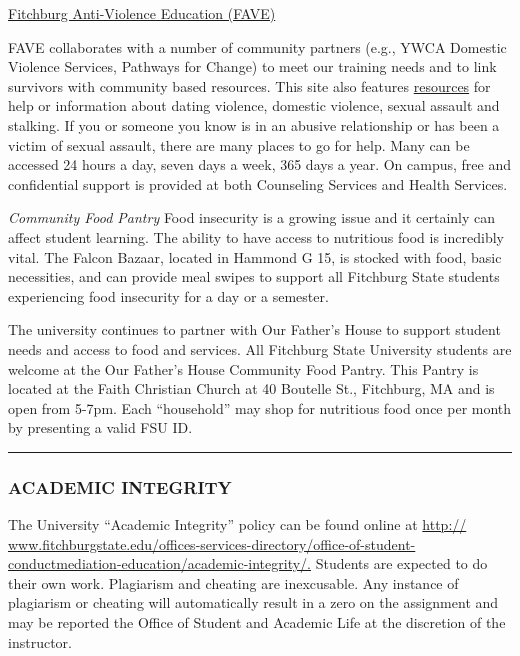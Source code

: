\documentclass[]{tufte-handout}
\begin{document}
\href{http://www.google.com/url?q=http\%3A\%2F\%2Fwww.fitchburgstate.edu\%2Foffices-services-directory\%2Ffitchburg-anti-violence-education\%2F\&sa=D\&sntz=1\&usg=AFQjCNFi5qy-wunMxX-hoWbA9YwT8aa4Ig}{Fitchburg
Anti-Violence Education (FAVE)}

FAVE collaborates with a number of community partners (e.g., YWCA
Domestic Violence Services, Pathways for Change) to meet our training
needs and to link survivors with community based resources. This site
also features
\href{http://www.google.com/url?q=http\%3A\%2F\%2Fwww.fitchburgstate.edu\%2Foffices-services-directory\%2Ffitchburg-anti-violence-education\%2Ffitchburg-anti-violence-education-resources\%2F\&sa=D\&sntz=1\&usg=AFQjCNF9KZ2O1AvPMLJTHdNg1DfmYYtgog}{resources}
for help or information about dating violence, domestic violence, sexual
assault and stalking. If you or someone you know is in an abusive
relationship or has been a victim of sexual assault, there are many
places to go for help. Many can be accessed 24 hours a day, seven days a
week, 365 days a year. On campus, free and confidential support is
provided at both Counseling Services and Health Services.

\emph{Community Food Pantry} Food insecurity is a growing issue and it
certainly can affect student learning. The ability to have access to
nutritious food is incredibly vital. The Falcon Bazaar, located in
Hammond G 15, is stocked with food, basic necessities, and can provide
meal swipes to support all Fitchburg State students experiencing food
insecurity for a day or a semester.

The university continues to partner with Our Father's House to support
student needs and access to food and services. All Fitchburg State
University students are welcome at the Our Father's House Community Food
Pantry. This Pantry is located at the Faith Christian Church at 40
Boutelle St., Fitchburg, MA and is open from 5-7pm. Each ``household''
may shop for nutritious food once per month by presenting a valid FSU
ID.

\begin{center}\rule{0.5\linewidth}{0.5pt}\end{center}

\hypertarget{academic-integrity}{%
\subsubsection{ACADEMIC INTEGRITY}\label{academic-integrity}}

The University ``Academic Integrity'' policy can be found online at
\href{http://www.fitchburgstate.edu/offices-services-directory/office-of-student-conduct-mediation-education/academic-integrity/}{http://
www.fitchburgstate.edu/offices-services-directory/office-of-student-conductmediation-education/academic-integrity/.}
Students are expected to do their own work. Plagiarism and cheating are
inexcusable. Any instance of plagiarism or cheating will automatically
result in a zero on the assignment and may be reported the Office of
Student and Academic Life at the discretion of the instructor.
\end{document}
